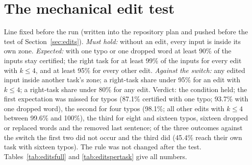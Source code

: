 \begin{table}[h]
  \caption{Fifteen tasks, original wording: score of each task right after it was learned $\to$ after
  the last task (tasks in the order of the sequence).}
  \label{tab:fifteenpertask}
  \centering
  \small
  
\end{table}

\begin{table}[h]
  \caption{Routes on the 15-task sequence: how many test inputs are certified, how many are given to
  their own task, and how many answers change, for the certified switch and for the nearest-centre
  rule. The rewordings are those of the five tasks that have them. Routes do not depend on the seed.}
  \label{tab:fifteenroutes}
  \centering
  \small
  \setlength{\tabcolsep}{3.5pt}
  
\end{table}

\FloatBarrier
\section{The mechanical edit test}
\label{app:edits}

Line fixed before the run (written into the repository plan and pushed before the test of Section~\ref{sec:edits}). \emph{Must hold:} without an edit, every input is inside its own zone. \emph{Expected:} with one typo or one dropped word at least 90\% of the inputs stay certified; the right task for at least 99\% of the inputs for every edit with $k \le 4$, and at least 95\% for every other edit. \emph{Against the switch:} any edited input inside another task's zone; a right-task share under 95\% for an edit with $k \le 4$; a right-task share under 80\% for any edit.
Verdict: the condition held; the first expectation was missed for typos (87.1\% certified with one typo; 93.7\% with one dropped word), the second for four typos (98.1\%; all other edits with $k \le 4$ between 99.6\% and 100\%), the third for eight and sixteen typos, sixteen dropped or replaced words and the removed last sentence; of the three outcomes against the switch the first two did not occur and the third did (45.4\% reach their own task with sixteen typos). The rule was not changed after the test. Tables~\ref{tab:editsfull} and \ref{tab:editspertask} give all numbers.

\begin{table}[h]
  \caption{The mechanical edit test in full (fifteen tasks, 1{,}197 test inputs per row, 1{,}097 in
  the last three rows; T5-base word-vectors). ``Worst task'': the task with the lowest share.}
  \label{tab:editsfull}
  \centering
  \footnotesize
  
\end{table}

